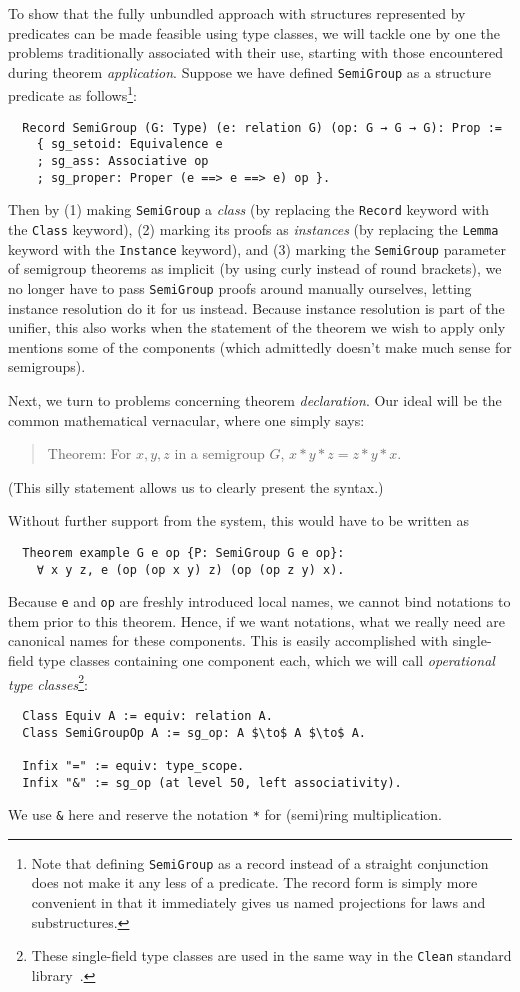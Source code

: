 \documentclass[a4paper,10pt,runningheads]{llncs}
\begin{document}
To show that the fully unbundled approach with structures represented by predicates can be made feasible using type classes, we will tackle one by one the problems traditionally associated with their use, starting with those encountered during theorem \emph{application}. Suppose we have defined \lstinline|SemiGroup| as a structure predicate as follows\footnote{Note that defining \lstinline|SemiGroup| as a record instead of a straight conjunction does not make it any less of a predicate. The record form is simply more convenient in that it immediately gives us named projections for laws and substructures.}:
\begin{lstlisting}
  Record SemiGroup (G: Type) (e: relation G) (op: G → G → G): Prop :=
    { sg_setoid: Equivalence e
    ; sg_ass: Associative op
    ; sg_proper: Proper (e ==> e ==> e) op }.
\end{lstlisting}
Then by (1) making \lstinline|SemiGroup| a \emph{class} (by replacing the \lstinline|Record| keyword with the \lstinline|Class| keyword), (2) marking its proofs as \emph{instances} (by replacing the \lstinline|Lemma| keyword with the \lstinline|Instance| keyword), and (3) marking the \lstinline|SemiGroup| parameter of semigroup theorems as implicit (by using curly instead of round brackets), we no longer have to pass \lstinline|SemiGroup| proofs around manually ourselves, letting instance resolution do it for us instead. Because instance resolution is part of the unifier, this also works when the statement of the theorem we wish to apply only mentions some of the components (which admittedly doesn't make much sense for semigroups).

Next, we turn to problems concerning theorem \emph{declaration}. Our ideal will be the common mathematical vernacular, where one simply says:
\begin{quote}
Theorem: For $x, y, z$ in a semigroup $G$, $x * y * z = z * y * x$.
\end{quote}
(This silly statement allows us to clearly present the syntax.)

Without further support from the system, this would have to be written as
\begin{lstlisting}
  Theorem example G e op {P: SemiGroup G e op}:
    ∀ x y z, e (op (op x y) z) (op (op z y) x).
\end{lstlisting}
Because \lstinline|e| and \lstinline{op} are freshly introduced local names, we cannot bind notations to them prior to this theorem. Hence, if we want notations, what we really need are canonical names for these components. This is easily accomplished with single-field type classes containing one component each, which we will call \emph{operational type classes}\footnote{These single-field type classes are used in the same way in the \lstinline|Clean| standard library~\cite{clean}.}:
\begin{lstlisting}
  Class Equiv A := equiv: relation A.
  Class SemiGroupOp A := sg_op: A $\to$ A $\to$ A.

  Infix "=" := equiv: type_scope.
  Infix "&" := sg_op (at level 50, left associativity).
\end{lstlisting}
We use \lstinline|&| here and reserve the notation \lstinline|*| for (semi)ring multiplication.
\end{document}
